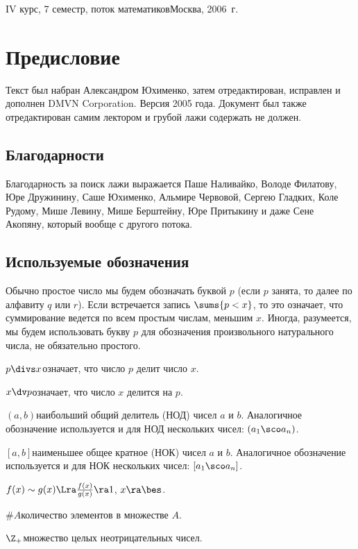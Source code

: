 \documentclass[a4paper]{article}
\begin{document}
{IV курс, 7 семестр, поток математиков}{Москва, 2006~г.}

\section*{Предисловие}

Текст был набран Александром Юхименко, затем отредактирован, исправлен и дополнен DMVN Corporation.
Версия 2005 года. Документ был также отредактирован самим лектором и грубой лажи содержать не должен.

\medskip

\dmvntrail

\subsection*{Благодарности}

Благодарность за поиск лажи выражается Паше Наливайко, Володе Филатову, Юре Дружинину,
Саше Юхименко, Альмире Червовой, Сергею Гладких, Коле Рудому, Мише Левину,
Мише Берштейну, Юре Притыкину и даже Сене Акопяну, который вообще с другого потока.

\subsection*{Используемые обозначения}

Обычно простое число мы будем обозначать буквой $p$ (если $p$ занята, то далее по алфавиту $q$ или $r$).
Если встречается запись $\sums{p<x}$, то это означает, что суммирование ведется по всем простым числам,
меньшим $x$. Иногда, разумеется, мы будем использовать букву $p$ для обозначения произвольного натурального числа,
не обязательно простого.

\begin{items}{-2}
\item $p\divs x$\т означает, что число $p$ делит число $x$.
\item $x\dv p$\т означает, что число $x$ делится на $p$.
\item $(a,b)$\т наибольший общий делитель (НОД) чисел $a$ и $b$. Аналогичное обозначение используется
      и для НОД нескольких чисел: $(a_1\sco a_n)$.
\item $[a,b]$\т наименьшее общее кратное (НОК) чисел $a$ и $b$. Аналогичное обозначение используется
      и для НОК нескольких чисел: $[a_1\sco a_n]$.
\item $f(x)\sim g(x)\Lra \frac{f(x)}{g(x)}\ra 1$, $x\ra \bes$.
\item $\# A$\т количество элементов в множестве $A$.
\item $\Z_+$\т множество целых неотрицательных чисел.
\end{items}
\end{document}
